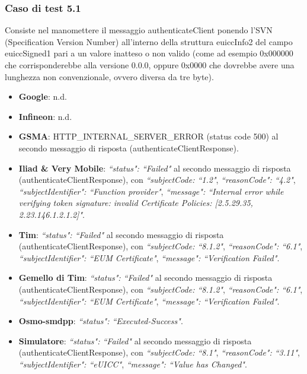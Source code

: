 \documentclass[10pt, oneside]{book}
\begin{document}
\subsubsection{Caso di test 5.1}
Consiste nel manomettere il messaggio authenticateClient ponendo l'SVN (Specification Version Number) all'interno della struttura euiccInfo2 del campo euiccSigned1 pari a un valore inatteso o non valido (come ad esempio 0x000000 che corrisponderebbe alla versione 0.0.0, oppure 0x0000 che dovrebbe avere una lunghezza non convenzionale, ovvero diversa da tre byte).
\begin{itemize}
\item \textbf{Google}: n.d.
\item \textbf{Infineon}: n.d.
\item \textbf{GSMA}: HTTP\_INTERNAL\_SERVER\_ERROR (status code 500) al secondo messaggio di risposta (authenticateClientResponse).
\item \textbf{Iliad \& Very Mobile}: \textit{``status": ``Failed"} al secondo messaggio di risposta (authenticateClientResponse), con \textit{``subjectCode: ``1.2"}, \textit{``reasonCode": ``4.2"}, \textit{``subjectIdentifier": ``Function provider"}, \textit{``message": ``Internal error while verifying token signature: invalid Certificate Policies: [2.5.29.35, 2.23.146.1.2.1.2]"}.
\item \textbf{Tim}: \textit{``status": ``Failed"} al secondo messaggio di risposta (authenticateClientResponse), con \textit{``subjectCode: ``8.1.2"}, \textit{``reasonCode": ``6.1"}, \textit{``subjectIdentifier": ``EUM Certificate"}, \textit{``message": ``Verification Failed"}.
\item \textbf{Gemello di Tim}: \textit{``status": ``Failed"} al secondo messaggio di risposta (authenticateClientResponse), con \textit{``subjectCode: ``8.1.2"}, \textit{``reasonCode": ``6.1"}, \textit{``subjectIdentifier": ``EUM Certificate"}, \textit{``message": ``Verification Failed"}.
\item \textbf{Osmo-smdpp}: \textit{``status": ``Executed-Success"}.
\item \textbf{Simulatore}: \textit{``status": ``Failed"} al secondo messaggio di risposta (authenticateClientResponse), con \textit{``subjectCode: ``8.1"}, \textit{``reasonCode": ``3.11"}, \textit{``subjectIdentifier": ``eUICC"}, \textit{``message": ``Value has Changed"}.
\end{itemize}
\end{document}
